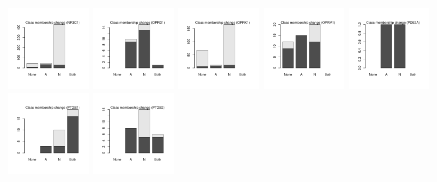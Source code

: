 \documentclass[10pt,article]{memoir}
\begin{document}
\begin{figure}[h!]
\includegraphics[width=0.19\textwidth]{figures/validation_plots/nr3c1_0p9_valplot.pdf}
\includegraphics[width=0.19\textwidth]{figures/validation_plots/oprd1_0p9_valplot.pdf}
\includegraphics[width=0.19\textwidth]{figures/validation_plots/oprk1_0p9_valplot.pdf}
\includegraphics[width=0.19\textwidth]{figures/validation_plots/oprm1_0p9_valplot.pdf}
\includegraphics[width=0.19\textwidth]{figures/validation_plots/pde3a_0p9_valplot.pdf}
\includegraphics[width=0.19\textwidth]{figures/validation_plots/ptgs1_0p9_valplot.pdf}
\includegraphics[width=0.19\textwidth]{figures/validation_plots/ptgs2_0p9_valplot.pdf}

\end{figure}
\end{document}
